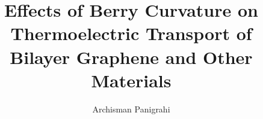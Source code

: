 \author{Archisman Panigrahi}

\title{\bfseries Effects of Berry Curvature on Thermoelectric Transport of Bilayer Graphene and Other Materials}

